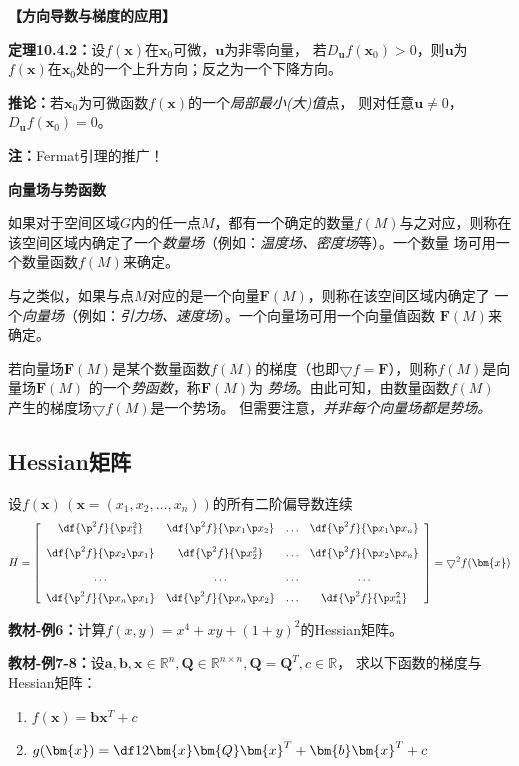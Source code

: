 {\bf 【方向导数与梯度的应用】}

{\bf 定理10.4.2：}设$f(\bm{x})$在$\bm{x}_0$可微，$\bm{u}$为非零向量，
若$D_{\bm{u}}f(\bm{x}_0)>0$，则$\bm{u}$为
$f(\bm{x})$在$\bm{x}_0$处的一个上升方向；反之为一个下降方向。

{\bf 推论：}若$\bm{x}_0$为可微函数$f(\bm{x})$的一个{\it 局部最小(大)值}点，
则对任意$\bm{u}\ne 0$，$D_{\bm{u}}f(\bm{x}_0)=0$。

{\bf 注：}Fermat引理的推广！

\begin{shaded}
	{\bf 向量场与势函数}
	
	如果对于空间区域$G$内的任一点$M$，都有一个确定的数量$f(M)$与之对应，则称在
	该空间区域内确定了一个{\it 数量场}（例如：{\it 温度场、密度场}等）。一个数量
	场可用一个数量函数$f(M)$来确定。
	
	与之类似，如果与点$M$对应的是一个向量$\bm{F}(M)$，则称在该空间区域内确定了
	一个{\it 向量场}（例如：{\it 引力场、速度场}）。一个向量场可用一个向量值函数
	$\bm{F}(M)$来确定。
	
	若向量场$\bm{F}(M)$是某个数量函数$f(M)$的梯度（也即$\bigtriangledown
	f=\bm{F}$），则称$f(M)$是向量场$\bm{F}(M)$ 的一个{\it 势函数}，称$\bm{F}(M)$为{\it
	势场}。由此可知，由数量函数$f(M)$ 产生的梯度场$\bigtriangledown f(M)$是一个势场。
	但需要注意，{\it 并非每个向量场都是势场。}
	
\end{shaded}

\subsection{Hessian矩阵}

设$f(\bm{x})\,(\bm{x}=(x_1,x_2,\ldots,x_n))$的所有二阶偏导数连续 
$$H=\left[\begin{array}{cccc}
	\df{\p^2 f}{\p x_1^2} & \df{\p^2 f}{\p x_1\p x_2} & \ldots & \df{\p^2
	f}{\p x_1\p x_n}\\[10pt]
	\df{\p^2 f}{\p x_2\p x_1} & \df{\p^2 f}{\p x_2^2} & \ldots & \df{\p^2
	f}{\p x_2\p x_n}\\[10pt]
	\ldots & \ldots & \ldots & \ldots\\[6pt]
	\df{\p^2 f}{\p x_n\p x_1} & \df{\p^2 f}{\p x_n\p x_2} & \ldots & \df{\p^2
	f}{\p x_n^2}
	\end{array}\right]
=\bigtriangledown^2 f(\bm{x})$$

{\bf 教材-例6：}计算$f(x,y)=x^4+xy+(1+y)^2$的Hessian矩阵。

{\bf 教材-例7-8：}设$\bm{a},\bm{b},\bm{x}\in\mathbb{R}^n,\bm{Q}
\in\mathbb{R}^{n\times n},\bm{Q}=\bm{Q}^T,c\in\mathbb{R}$，
求以下函数的梯度与Hessian矩阵：
\begin{enumerate}[(1)]
  \setlength{\itemindent}{1cm}
  \item $f(\bm{x})=\bm{b}\bm{x}^{T}+c$
  \item $g(\bm{x})=\df 12\bm{x}\bm{Q}\bm{x}^T+\bm{b}\bm{x}^{T}+c$
\end{enumerate}

